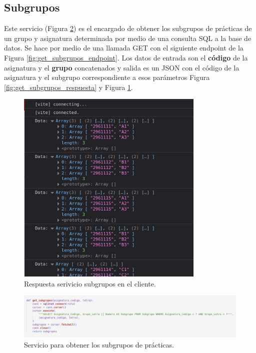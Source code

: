 \subsection*{Subgrupos}

Este servicio (Figura \ref{fig:get_subgrupos}) es el encargado de obtener los subgrupos de prácticas de un grupo y asignatura determinada por medio de una consulta SQL a la base de datos. Se hace por medio de una llamada GET con el siguiente endpoint de la Figura \ref{fig:get_subgrupos_endpoint}. Los datos de entrada son el \textbf{código} de la asignatura y el \textbf{grupo} concatenados y salida es un JSON con el código de la asignatura y el subgrupo correspondiente a esos parámetros Figura \ref{fig:get_subgrupos_respuesta} y Figura \ref{fig:get_subgrupos_respuesta_cliente}.

\begin{figure}[H]
    \centering
    \includegraphics[width=0.8\textwidth]{./imagenes/get_subgrupos_respuesta_cliente.png}
    \caption{Respuesta serivicio subgrupos en el cliente.}
    \label{fig:get_subgrupos_respuesta_cliente}
\end{figure}

\begin{figure}[H]
    \centering
    \includegraphics[width=1.1\textwidth]{./imagenes/get_subgrupos.png}
    \caption{Servicio para obtener los subgrupos de prácticas.}
    \label{fig:get_subgrupos}
\end{figure}

